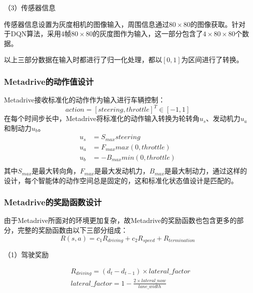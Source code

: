 （3）传感器信息

传感器信息设置为灰度相机的图像输入，周围信息通过$80\times80$的图像获取。针对于DQN算法，采用4帧$80\times80$的灰度图作为输入，这一部分包含了$4\times80\times80$个数据。

以上三部分数据在输入时都进行了归一化处理，都以$[0,1]$为区间进行了转换。

\subsubsection{Metadrive的动作值设计}

Metadrive接收标准化的动作作为输入进行车辆控制：
\begin{equation*}
    action = [steering, throttle]^{T} \in [-1,1]
\end{equation*}
在每个时间步长中，Metadrive将标准化的动作输入转换为轮转角$u_s$、发动机力$u_a$和制动力$u_b$。
\begin{equation*}
    \begin{aligned}
        u_s &= S_{max} steering\\
        u_a &= F_{max} max(0,throttle)\\
        u_b &= -B_{max} min(0,throttle)\\
    \end{aligned}
\end{equation*}
其中$S_{max}$是最大转向角，$F_{max}$是最大发动机力，$B_{max}$是最大制动力，通过这样的设计，每个智能体的动作空间总是固定的，这和标准化状态值设计是匹配的。

\subsubsection{Metadrive的奖励函数设计}

由于Metadrive所面对的环境更加复杂，故Metadrive的奖励函数也包含更多的部分，完整的奖励函数由以下三部分组成：
\begin{equation}
    R(s,a) = c_1 R_{driving} + c_2 R_{speed} + R_{termination}
\end{equation}

（1）驾驶奖励

\begin{equation*}
    \begin{aligned}
        &R_{driving} = (d_t - d_{t-1}) \times lateral\_factor\\
        &lateral\_factor = 1 - \frac{2\times lateral\_now }{lane\_width}
    \end{aligned}
\end{equation*}

